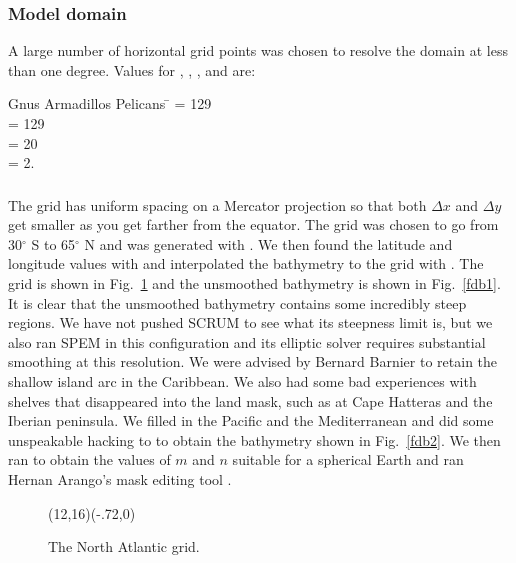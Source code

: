 \subsubsection{Model domain}
A large number of horizontal grid points was chosen to resolve the
domain at less than one degree.  Values for , ,
, and  are:
\begin{tabbing}
  Gnus Armadillos Pelicans \= \kill
  \>  = 129 \\
  \>  = 129 \\
  \>  = 20 \\
  \>  = 2.
\end{tabbing}

\subsubsection{}
The grid has uniform spacing on a Mercator projection so that both
$\Delta x$ and $\Delta y$ get smaller as you get farther from the
equator.  The grid was chosen to go from 30$^\circ$ S to 65$^\circ$ N
and was generated with .  We then found the latitude and
longitude values with  and interpolated the 
bathymetry to the grid with .  The grid is shown in
Fig.\ \ref{fdg} and the unsmoothed bathymetry is shown in Fig.\
\ref{fdb1}.  It is clear that the unsmoothed bathymetry contains some
incredibly steep regions.  We have not pushed SCRUM to see what its
steepness limit is, but we also ran SPEM in this configuration and its
elliptic solver requires substantial smoothing at this resolution.
We were advised by Bernard Barnier to retain the shallow island
arc in the Caribbean.  We also had some bad experiences with shelves
that disappeared into the land mask, such as at Cape Hatteras and
the Iberian peninsula.  We filled in the Pacific and the Mediterranean
and did some unspeakable hacking to \code{bathsuds} to obtain the
bathymetry shown in Fig.\ \ref{fdb2}.  We then ran \code{sphere} to
obtain the values of $m$ and $n$ suitable for a spherical Earth and ran
Hernan Arango's mask editing tool \code{scrum\_mask}.

\begin{figure}
\setlength{\unitlength}{1cm}
  \begin{picture}(12,16)(-.72,0)
  \end{picture}
\caption{The North Atlantic grid.}
\label{fdg}
\end{figure}

